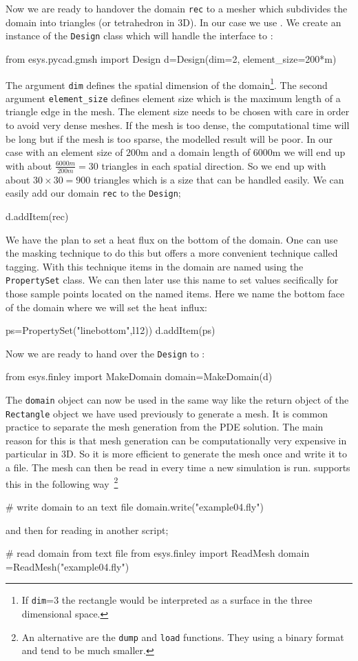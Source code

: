 Now we are ready to handover the domain \verb|rec| to a mesher which subdivides
the domain into triangles (or tetrahedron in 3D). In our case we use \gmsh. We
create 
an instance of the \verb|Design| class which will handle the interface to
\gmsh: 
\begin{python}
from esys.pycad.gmsh import Design 
d=Design(dim=2, element_size=200*m)
\end{python}
The argument \verb|dim| defines the spatial dimension of the domain\footnote{If
\texttt{dim}=3 the rectangle would be interpreted as a surface in the three
dimensional space.}. The second argument \verb|element_size| defines element
size which is the maximum length of a triangle edge in the mesh. The element
size needs to be chosen with care in order to avoid very dense meshes. If the
mesh is too dense, the computational time will be long but if the mesh is too
sparse, the modelled result will be poor. In our case with an element size of
$200$m 
and a domain length of $6000$m we will end up with about $\frac{6000m}{200m}=30$
triangles in each spatial direction. So we end up with about $30 \times 30 =
900$ triangles which is a size that can be handled easily.
We can easily add our domain \verb|rec| to the \verb|Design|;
\begin{python}
d.addItem(rec)
\end{python}
We have the plan to set a heat flux on the bottom of the domain. One can use the
masking technique to do this
but \pycad offers a more convenient technique called tagging. With this
technique items in the domain are
named using the \verb|PropertySet| class. We can then later use this name to set
values secifically for
those sample points located on the named items. Here we name the bottom face of
the 
domain where we will set the heat influx:
\begin{python}
ps=PropertySet("linebottom",l12))
d.addItem(ps)
\end{python}
Now we are ready to hand over the \verb|Design| to \FINLEY:
\begin{python}
from esys.finley import MakeDomain
domain=MakeDomain(d)
\end{python}
The \verb|domain| object can now be used in the same way like the return object
of the \verb|Rectangle| 
object we have used previously to generate a mesh. It is common practice to
separate the 
mesh generation from the PDE solution. The main reason for this is that mesh
generation can be computationally very expensive in particular in 3D. So it is
more efficient to generate the mesh once and write it to a file. The mesh
can then be read in every time a new simulation is run. \FINLEY supports this in
the following 
way~\footnote{An alternative are the \texttt{dump} and \texttt{load} functions.
They using a binary format and tend to be much smaller.}
\begin{python}
# write domain to an text file
domain.write("example04.fly")
\end{python}
and then for reading in another script;
\begin{python}
# read domain from text file
from esys.finley import ReadMesh
domain =ReadMesh("example04.fly")
\end{python}

